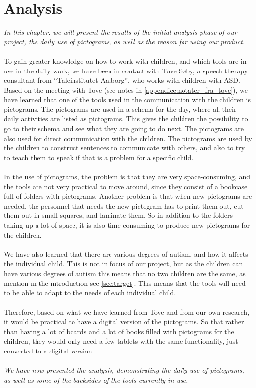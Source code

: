 \chapter{Analysis}

\textit{In this chapter, we will present the results of the initial analysis phase of our project, the daily use of pictograms, as well as the reason for using our product.}\\
\\
To gain greater knowledge on how to work with children, and which tools are in use in the daily work, we have been in contact with  Tove S\o{}by, a speech therapy consultant from ``Taleinstitutet Aalborg'', who works with children with ASD.\\ 

Based on the meeting with Tove (see notes in \autoref{appendice:notater_fra_tove}), we have learned that one of the tools used in the communication with the children is pictograms.
The pictograms are used in a schema for the day, where all their daily activities are listed as pictograms.
This gives the children the possibility to go to their schema and see what they are going to do next. 
The pictograms are also used for direct communication with the children. The pictograms are used by the children to construct sentences to communicate with others, and also to try to teach them to speak if that is a problem for a specific child.\\
\\
In the use of pictograms, the problem is that they are very space-consuming, and the tools are not very practical to move around, since they consist of a bookcase full of folders with pictograms. 
Another problem is that when new pictograms are needed, the personnel that needs the new pictogram has to print them out, cut them out in small squares, and laminate them. 
So in addition to the folders taking up a lot of space, it is also time consuming to produce new pictograms for the children.\\ 
\\
We have also learned that there are various degrees of autism, and how it affects the individual child. 
This is not in focus of our project, but as the children can have various degrees of autism this means that no two children are the same, as mention in the introduction see \autoref{sec:target}. 
This means that the tools will need to be able to adapt to the needs of each individual child.\\
\\ 
Therefore, based on what we have learned from Tove and from our own research, it would be practical to have a digital version of the pictograms. So that rather than having a lot of boards and a lot of books filled with pictograms for the children, they would only need a few tablets with the same functionality, just converted to a digital version.\\
\\
\textit{We have now presented the analysis, demonstrating the daily use of pictograms, as well as some of the backsides of the tools currently in use. }